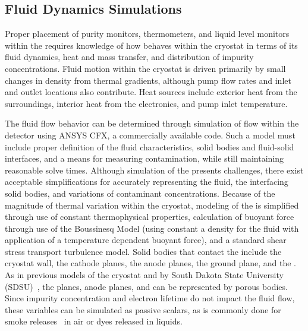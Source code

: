 \subsection{Fluid Dynamics Simulations}
\label{sec:fdgen-slow-cryo-cfd}

Proper placement of purity monitors, thermometers, and liquid level monitors within the  requires knowledge of how  behaves within the cryostat in terms of its fluid dynamics, heat and mass transfer, and distribution of impurity concentrations. 
Fluid motion within the cryostat is driven primarily by small changes in density from thermal gradients, although pump flow rates and inlet and outlet locations also contribute. 
Heat sources include exterior heat from the surroundings, interior heat from the electronics, and pump inlet temperature. 

The fluid flow behavior can be determined through simulation of  flow within the detector using ANSYS CFX, a commercially available  code. Such a model must include proper definition of the fluid characteristics, solid bodies and fluid-solid interfaces, and a means for measuring contamination, while still maintaining reasonable solve times.
Although simulation of the  presents challenges, there exist acceptable simplifications for accurately representing the fluid, the interfacing solid bodies, and variations of contaminant concentrations. Because of the magnitude of thermal variation within the cryostat, modeling of the  is simplified through use of constant thermophysical properties, calculation of buoyant force through use of the Boussinesq Model (using constant a density for the fluid with application of a temperature dependent buoyant force), and a standard shear stress transport turbulence model. Solid bodies that contact the  include the cryostat wall, the cathode planes, the anode planes, the ground plane, and the . As in previous  models of the  cryostat and  by South Dakota State University (SDSU)~\cite{docdb-5915}, the  planes, anode planes, and  can be represented by porous bodies. Since impurity concentration and electron lifetime do not impact the fluid flow, these variables can be simulated as  passive scalars, as is commonly done for smoke releases~\cite{cfd-1} in air or dyes released in liquids.

